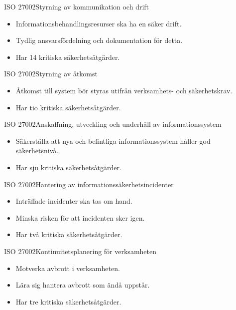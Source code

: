 \documentclass{beamer}
\begin{document}
\begin{frame}{ISO 27002}{Styrning av kommunikation och drift}
  \begin{itemize}
    \item Informationsbehandlingsresurser ska ha en säker drift.
    \item Tydlig ansvarsfördelning och dokumentation för detta.
    \item Har 14 kritiska säkerhetsåtgärder.
  \end{itemize}
\end{frame}

\begin{frame}{ISO 27002}{Styrning av åtkomst}
  \begin{itemize}
    \item Åtkomst till system bör styras utifrån verksamhets- och 
      säkerhetskrav.
    \item Har tio kritiska säkerhetsåtgärder.
  \end{itemize}
\end{frame}

\begin{frame}{ISO 27002}{Anskaffning, utveckling och underhåll av 
  informationssystem}
  \begin{itemize}
    \item Säkerställa att nya och befintliga informationssystem håller god 
      säkerhetsnivå.
    \item Har sju kritiska säkerhetsåtgärder.
  \end{itemize}
\end{frame}

\begin{frame}{ISO 27002}{Hantering av informationssäkerhetsincidenter}
  \begin{itemize}
    \item Inträffade incidenter ska tas om hand.
    \item Minska risken för att incidenten sker igen.
    \item Har två kritiska säkerhetsåtgärder.
  \end{itemize}
\end{frame}

\begin{frame}{ISO 27002}{Kontinuitetsplanering för verksamheten}
  \begin{itemize}
    \item Motverka avbrott i verksamheten.
    \item Lära sig hantera avbrott som ändå uppstår.
    \item Har tre kritiska säkerhetsåtgärder.
  \end{itemize}
\end{frame}
\end{document}
